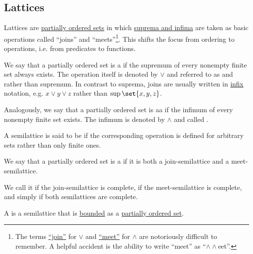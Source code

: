 \subsection{Lattices}\label{subsec:lattices}

\begin{definition}\label{def:semilattice}
  Lattices are \hyperref[def:partially_ordered_set]{partially ordered sets} in which \hyperref[def:extremal_points/supremum_and_infimum]{suprema and infima} are taken as basic operations called \enquote{joins} and \enquote{meets}\footnote{The terms \hyperref[def:semilattice/join]{\enquote{join}} for \( \vee \) and \hyperref[def:semilattice/meet]{\enquote{meet}} for \( \wedge \) are notoriously difficult to remember. A helpful accident is the ability to write \enquote{meet} as \enquote{\( \wedge \wedge \)eet}.}. This shifts the focus from ordering to operations, i.e. from predicates to functions.

  \begin{thmenum}[series=def:semilattice]
     We say that a partially ordered set is a  if the supremum of every nonempty finite set always exists. The operation itself is denoted by \( \vee \) and referred to as  and rather than supremum. In contrast to suprema, joins are usually written in \hyperref[rem:first_order_formula_conventions/infix]{infix} notation, e.g. \( x \vee y \vee z \) rather than \( \sup\set{ x, y, z } \).

     Analogously, we say that a partially ordered set is aa  if the infimum of every nonempty finite set exists. The infimum is denoted by \( \wedge \) and called .

     A semilattice is said to be  if the corresponding operation is defined for arbitrary sets rather than only finite ones.

     We say that a partially ordered set is a  if it is both a join-semilattice and a meet-semilattice.

    We call it  if the join-semilattice is complete,  if the meet-semilattice is complete, and simply  if both semilattices are complete.

     A  is a semilattice that is \hyperref[def:extremal_points/top_and_bottom]{bounded} as a \hyperref[def:partially_ordered_set]{partially ordered set}.


\end{thmenum}
\end{definition}
